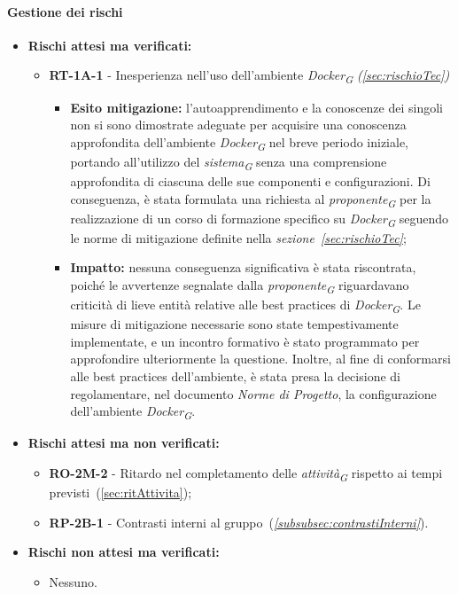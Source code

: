 \paragraph{Gestione dei rischi} 

\begin{itemize}
    \item \textbf{Rischi attesi ma verificati:}
\begin{itemize}
    \item \textbf{RT-1A-1} - Inesperienza nell'uso dell'ambiente \textit{Docker}\textsubscript{\textit{G}} \textit{(\ref{sec:rischioTec})}
    \begin{itemize}
        \item \textbf{Esito mitigazione:} 
            l'autoapprendimento e la conoscenze dei singoli non si sono dimostrate adeguate per acquisire una conoscenza approfondita dell'ambiente \textit{Docker}\textsubscript{\textit{G}} nel breve periodo iniziale, portando all'utilizzo del \textit{sistema}\textsubscript{\textit{G}} senza una comprensione approfondita di ciascuna delle sue componenti e configurazioni. Di conseguenza, è stata formulata una richiesta al \textit{proponente}\textsubscript{\textit{G}} per la realizzazione di un corso di formazione specifico su \textit{Docker}\textsubscript{\textit{G}} seguendo le norme di mitigazione definite nella \textit{sezione~\ref{sec:rischioTec}};

        \pagebreak
        
        \item \textbf{Impatto:}
            nessuna conseguenza significativa è stata riscontrata, poiché le avvertenze segnalate dalla \textit{proponente}\textsubscript{\textit{G}} riguardavano criticità di lieve entità relative alle best practices di \textit{Docker}\textsubscript{\textit{G}}. Le misure di mitigazione necessarie sono state tempestivamente implementate, e un incontro formativo è stato programmato per approfondire ulteriormente la questione.
            Inoltre, al fine di conformarsi alle best practices dell'ambiente, è stata presa la decisione di regolamentare, nel documento \textit{Norme di Progetto}, la configurazione dell'ambiente \textit{Docker}\textsubscript{\textit{G}}.
    \end{itemize}
\end{itemize}
\item \textbf{Rischi attesi ma non verificati:}
 \begin{itemize}
    \item \textbf{RO-2M-2} - Ritardo nel completamento delle \textit{attività}\textsubscript{\textit{G}} rispetto ai tempi previsti~(\ref{sec:ritAttivita});
    \item \textbf{RP-2B-1} - Contrasti interni al gruppo~(\textit{\ref{subsubsec:contrastiInterni}}).
\end{itemize}
\item \textbf{Rischi non attesi ma verificati:}
\begin{itemize}
    \item Nessuno.
\end{itemize}
\end{itemize}

